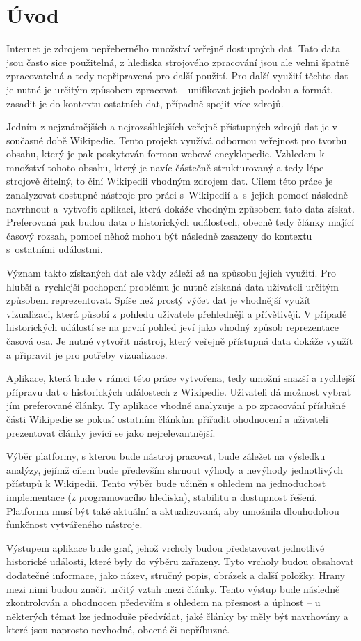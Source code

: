 \chapter{Úvod}
Internet je zdrojem nepřeberného množství veřejně dostupných dat. Tato data jsou často sice použitelná, z hlediska strojového zpracování jsou ale velmi špatně zpracovatelná a tedy nepřipravená pro další použití. Pro další využití těchto dat je nutné je určitým způsobem zpracovat -- unifikovat jejich podobu a formát, zasadit je do kontextu ostatních dat, případně spojit více zdrojů.

Jedním z nejznámějších a nejrozsáhlejších veřejně přístupných zdrojů dat je v současné době Wikipedie. Tento projekt využívá odbornou veřejnost pro tvorbu obsahu, který je pak poskytován formou webové encyklopedie. Vzhledem k množství tohoto obsahu, který je navíc částečně strukturovaný a tedy lépe strojově čitelný, to činí Wikipedii vhodným zdrojem dat. Cílem této práce je zanalyzovat dostupné nástroje pro práci s~Wikipedií a~s~jejich pomocí následně navrhnout a~vytvořit aplikaci, která dokáže vhodným způsobem tato data získat. Preferovaná pak budou data o historických událostech, obecně tedy články mající časový rozsah, pomocí něhož mohou být následně zasazeny do kontextu s~ostatními událostmi.

Význam takto získaných dat ale vždy záleží až na způsobu jejich využití. Pro hlubší a~rychlejší pochopení problému je nutné získaná data uživateli určitým způsobem reprezentovat. Spíše než prostý výčet dat je vhodnější využít vizualizaci, která působí z pohledu uživatele přehledněji a přívětivěji. V případě historických událostí se na první pohled jeví jako vhodný způsob reprezentace časová osa. Je nutné vytvořit nástroj, který veřejně přístupná data dokáže využít a připravit je pro potřeby vizualizace.

Aplikace, která bude v rámci této práce vytvořena, tedy umožní snazší a rychlejší přípravu dat o historických událostech z Wikipedie. Uživateli dá možnost vybrat jím preferované články. Ty aplikace vhodně analyzuje a po zpracování příslušné části Wikipedie se pokusí ostatním článkům přiřadit ohodnocení a uživateli prezentovat články jevící se jako nejrelevantnější.

Výběr platformy, s kterou bude nástroj pracovat, bude záležet na výsledku analýzy, jejímž cílem bude především shrnout výhody a nevýhody jednotlivých přístupů k Wikipedii. Tento výběr bude učiněn s ohledem na jednoduchost implementace (z programovacího hlediska), stabilitu a dostupnost řešení. Platforma musí být také aktuální a aktualizovaná, aby umožnila dlouhodobou funkčnost vytvářeného nástroje.

Výstupem aplikace bude graf, jehož vrcholy budou představovat jednotlivé historické události, které byly do výběru zařazeny. Tyto vrcholy budou obsahovat dodatečné informace, jako název, stručný popis, obrázek a další položky. Hrany mezi nimi budou značit určitý vztah mezi články. Tento výstup bude následně zkontrolován a ohodnocen především s ohledem na přesnost a úplnost -- u některých témat lze jednoduše předvídat, jaké články by měly být navrhovány a které jsou naprosto nevhodné, obecné či nepříbuzné.